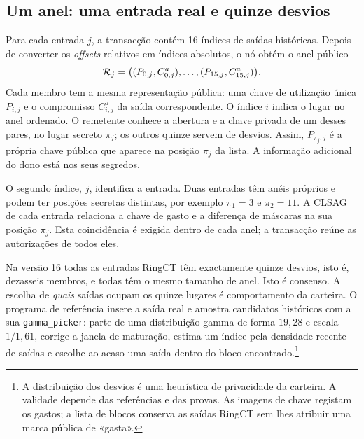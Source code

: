 \subsection{Um anel: uma entrada real e quinze desvios}

Para cada entrada \(j\), a transacção contém 16 índices de saídas históricas.
Depois de converter os \emph{offsets} relativos em índices absolutos, o nó
obtém o anel público
\begin{align}
 \mathcal R_j=
 \bigl((P_{0,j},C^a_{0,j}),\ldots,(P_{15,j},C^a_{15,j})\bigr).
 \label{eq:transaction-ring}
\index{pi@\(\pi_j\), posição secreta no anel}
\index{anel@anel!lista ordenada@lista ordenada}
\index{anel@anel!posicao secreta@posição secreta}
\end{align}
Cada membro tem a mesma representação pública: uma chave de utilização
única \(P_{i,j}\) e o compromisso \(C^a_{i,j}\) da saída correspondente.
O índice \(i\) indica o lugar no anel ordenado. O remetente conhece a
abertura e a chave privada de um desses pares, no lugar secreto
\(\pi_j\); os outros quinze servem de desvios. Assim, \(P_{\pi_j,j}\)
é a própria chave pública que aparece na posição \(\pi_j\) da lista.
A informação adicional do dono está nos seus segredos.

O segundo índice, \(j\), identifica a entrada. Duas entradas têm anéis
próprios e podem ter posições secretas distintas, por exemplo
\(\pi_1=3\) e \(\pi_2=11\). A CLSAG de cada entrada relaciona a chave
de gasto e a diferença de máscaras na sua posição \(\pi_j\). Esta
coincidência é exigida dentro de cada anel; a transacção reúne as
autorizações de todos eles.

Na versão 16 todas as entradas RingCT têm exactamente quinze desvios, isto
é, dezasseis membros, e todas têm o mesmo tamanho de anel. Isto é consenso.
%
A escolha de \emph{quais} saídas ocupam os quinze lugares é comportamento da
carteira. O programa de referência insere a saída real e amostra candidatos
históricos com a sua \texttt{gamma\_picker}: parte de uma distribuição gamma
de forma \(19{,}28\) e escala \(1/1{,}61\), corrige a janela de maturação,
estima um índice pela densidade recente de saídas e escolhe ao acaso uma
saída dentro do bloco encontrado.\footnote{A distribuição dos desvios é uma heurística de privacidade da
carteira. A validade depende das referências e das provas. As imagens de
chave registam os gastos; a lista de blocos conserva as saídas RingCT sem
lhes atribuir uma marca pública de «gasta».}

